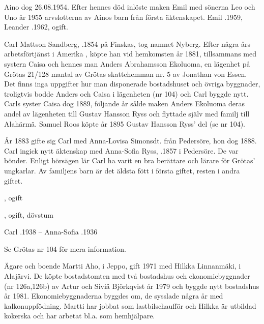 Aino dog 26.08.1954. Efter hennes död inlöste maken Emil med sönerna Leo och Uno år 1955 arvslotterna av Ainos barn från  första äktenskapet.
Emil .1959, Leander .1962, ogift.


Carl Mattson Sandberg, .1854 på Finskas, tog namnet Nyberg. Efter några års arbetsförtjänst i Amerika , köpte han vid hemkomsten år 1881, tillsammans med systern Caisa och hennes man Anders Abrahamsson Ekoluoma, en lägenhet på Grötas 21/128 mantal av Grötas skattehemman nr. 5 av Jonathan von Essen. Det finns inga uppgifter hur man disponerade bostadshuset och övriga byggnader, troligtvis bodde Anders och Caisa i lägenheten (nr 104) och Carl byggde nytt. Carls syster Caisa dog 1889, följande år sålde maken Anders Ekoluoma deras andel av lägenheten till Gustav Hansson Ryss och flyttade själv med familj till Alahärmä. Samuel Roos köpte år 1895 Gustav Hansson Ryss' del (se nr 104).

År 1883 gifte sig Carl med  Anna-Lovisa Simonsdt. från Pedersöre, hon dog 1888. Carl ingick nytt äktenskap med Anna-Sofia Ryss, .1857 i Pedersöre. De var bönder. Enligt hörsägen lär Carl ha varit en bra berättare och lärare för Grötas' ungkarlar. Av familjens barn är det äldsta fött i första giftet, resten i andra giftet.
\begin{jhchildren}
  \item {}, ogift
  \item {}
  \item {}
  \item {}, ogift, dövstum
\end{jhchildren}
Carl .1938  --  Anna-Sofia .1936


Se Grötas nr 104 för mera information.





Ägare och boende Martti Aho,  i Jeppo, gift 1971 med Hilkka Linnanmäki,  i Alajärvi. De köpte bostadstomten med två bostadshus och ekonomiebyggnader (nr 126a,126b) av Artur och Siviä Björkqvist år 1979 och byggde nytt bostadshus år 1981. Ekonomiebyggnaderna byggdes om, de sysslade några år med kalkonuppfödning. Martti har jobbat som lastbilschaufför och Hilkka är utbildad kokerska och har arbetat bl.a. som hemhjälpare.

